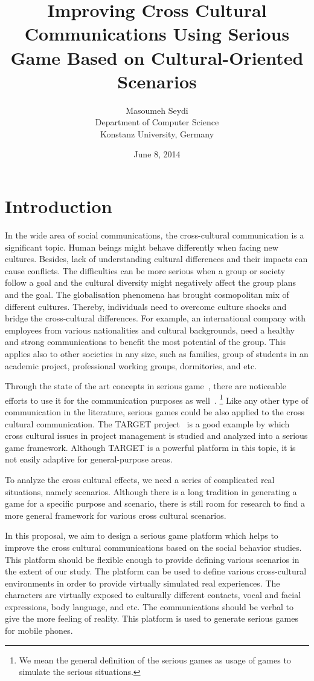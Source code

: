 \documentclass[conference]{IEEEtran}
\title{Improving Cross Cultural Communications Using Serious Game
Based on Cultural-Oriented Scenarios}
\date{June 8, 2014}
\author{Masoumeh Seydi\\ Department of Computer Science\\
       Konstanz University, Germany}
\begin{document}
\maketitle

\section{Introduction}

In the wide area of social communications, the cross-cultural communication is 
a significant topic. Human beings might behave differently when facing
new cultures. Besides, lack of understanding cultural differences and their impacts can cause conflicts. The difficulties can be more serious when a group or society 
follow a goal and the cultural diversity might negatively affect 
the group plans and the goal. 
The globalisation phenomena has brought cosmopolitan mix of different cultures. Thereby, individuals need to overcome culture shocks and bridge the cross-cultural differences.
For example, an international company with employees from various nationalities
and cultural backgrounds, need a healthy and strong communications to benefit the most potential
of the group.
This applies also to other societies in any size, such as families, group of students in an academic project, professional working groups, dormitories, and etc. 

Through the state of the art concepts in serious game~\cite{sergame1,sergame2}, 
there are noticeable efforts to use it for the communication purposes as well~\cite{comm-sergame}.
\footnote{We mean the general definition of the serious games as 
usage of games to simulate the serious situations.}
Like any other type of communication in the literature, serious games could be also applied 
to the cross cultural communication.
The TARGET project~\cite{project-manage} is a good example by which cross cultural issues in 
project management is studied and analyzed into a serious game framework.
Although TARGET is a powerful platform in this topic,
it is not easily adaptive for general-purpose areas.

To analyze the cross cultural effects, we need
a series of complicated real situations, namely scenarios.
Although there is a long tradition in generating a game
for a specific purpose and scenario, 
there is still room for research 
to find a more general framework for various cross cultural scenarios.

In this proposal, we aim to design a serious game platform which helps to 
improve the cross cultural communications based on the social behavior studies.
This platform should be flexible enough to provide 
defining various scenarios in the extent of our study. 
The platform can be used to define various cross-cultural environments in order to
provide virtually simulated real experiences. The characters are virtually exposed to culturally
different contacts, vocal and facial expressions, body language, and etc.
The communications should be verbal to give the more feeling of reality. 
This platform is used to generate serious games for mobile phones.
\end{document}
